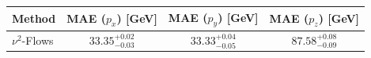     \begin{tabular}{lccc}
        \toprule
        Method & MAE ($p_x$) [GeV] & MAE ($p_y$) [GeV] & MAE ($p_z$) [GeV] \\
        \midrule
        $\nu^2$-Flows & $33.35^{+0.02}_{-0.03}$ & $33.33^{+0.04}_{-0.05}$ & $87.58^{+0.08}_{-0.09}$ \\
        \bottomrule
    \end{tabular}